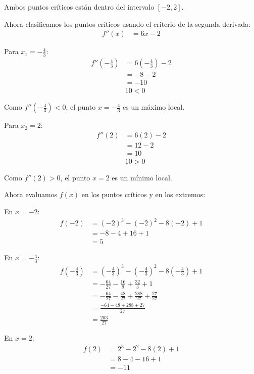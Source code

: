 \documentclass{article}
\begin{document}
Ambos puntos críticos están dentro del intervalo $[-2, 2]$.

Ahora clasificamos los puntos críticos usando el criterio de la segunda derivada:
\begin{align}
f''(x) &= 6x - 2
\end{align}

Para $x_1 = -\frac{4}{3}$:
\begin{align}
f''\left(-\frac{4}{3}\right) &= 6\left(-\frac{4}{3}\right) - 2 \\
&= -8 - 2 \\
&= -10 \\
&10 < 0
\end{align}

Como $f''(-\frac{4}{3}) < 0$, el punto $x = -\frac{4}{3}$ es un máximo local.

Para $x_2 = 2$:
\begin{align}
f''(2) &= 6(2) - 2 \\
&= 12 - 2 \\
&= 10 \\
&10> 0
\end{align}

Como $f''(2) > 0$, el punto $x = 2$ es un mínimo local.

Ahora evaluamos $f(x)$ en los puntos críticos y en los extremos:

En $x = -2$:
\begin{align}
f(-2) &= (-2)^{3} - (-2)^{2} - 8(-2) + 1 \\
&= -8 - 4 + 16 + 1 \\
&= 5
\end{align}

En $x = -\frac{4}{3}$:
\begin{align}
f\left(-\frac{4}{3}\right) &= \left(-\frac{4}{3}\right)^{3} - \left(-\frac{4}{3}\right)^{2} - 8\left(-\frac{4}{3}\right) + 1 \\
&= -\frac{64}{27} - \frac{16}{9} + \frac{32}{3} + 1 \\
&= -\frac{64}{27} - \frac{48}{27} + \frac{288}{27} + \frac{27}{27} \\
&= \frac{-64 - 48 + 288 + 27}{27} \\
&= \frac{203}{27}
\end{align}

En $x = 2$:
\begin{align}
f(2) &= 2^{3} - 2^{2} - 8(2) + 1 \\
&= 8 - 4 - 16 + 1 \\
&= -11
\end{align}
\end{document}
